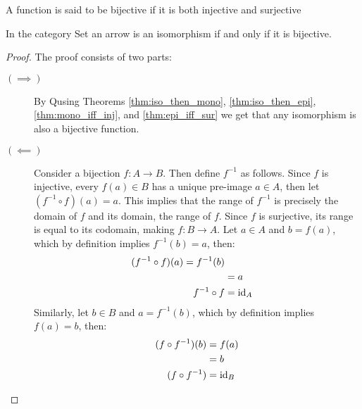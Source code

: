 \begin{definition}
  A function is said to be bijective if it is both injective and surjective
\end{definition}

\begin{theorem}
  In the category Set an arrow is an isomorphism if and only if it is
  bijective.

  \begin{proof}
    The proof consists of two parts:

    \begin{description}
      \item[$(\implies)$] By Qusing Theorems \ref{thm:iso_then_mono},
        \ref{thm:iso_then_epi}, \ref{thm:mono_iff_inj}, and
        \ref{thm:epi_iff_sur} we get that any isomorphism is also a bijective
        function.
      \item[$(\impliedby)$] Consider a bijection $f:A\to B$. Then define
        $f^{-1}$ as follows. Since $f$ is injective, every $f(a)\in B$ has a
        unique pre-image $a\in A$, then let $(f^{-1}\circ f)(a) = a$. This
        implies that the range of $f^{-1}$ is precisely the domain of $f$ and
        its domain, the range of $f$. Since $f$ is surjective, its range is
        equal to its codomain, making $f:B\to A$. Let $a\in A$ and $b=f(a)$,
        which by definition implies $f^{-1}(b)=a$, then:
        \[
          \begin{aligned}
            (f^{-1}\circ f)(a)
            = f^{-1}(b)\\
            &= a\\
            f^{-1}\circ f &= \mathrm{id}_A
          \end{aligned}
        \]
        Similarly, let $b\in B$ and $a=f^{-1}(b)$, which by definition implies
        $f(a)=b$, then:
        \[
          \begin{aligned}
            (f\circ f^{-1})(b)
            &= f(a)\\
            &= b\\
            (f\circ f^{-1}) &= \mathrm{id}_B
          \end{aligned}
        \]
    \end{description}
  \end{proof}
\end{theorem}